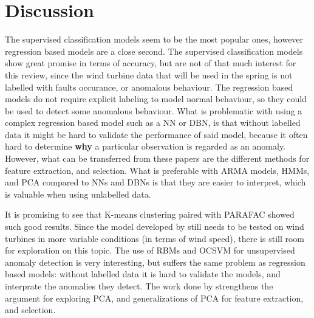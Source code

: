 \section{Discussion}
The supervised classification models seem to be the most popular ones, however regression based models are a close second. 
The supervised classification models show great promise in terms of accuracy, but are not of that much interest for this review, since the wind turbine data that will be used in the spring is not labelled with faults occurance, or anomalous behaviour. 
The regression based models do not require explicit labeling to model normal behaviour, so they could be used to detect some anomalous behaviour. 
What is problematic with using a complex regression based model such as a NN or DBN, is that without labelled data it might be hard to validate the performance of said model, because it often hard to determine \textbf{why} a particular observation is regarded as an anomaly. 
However, what can be transferred from these papers are the different methods for feature extraction, and selection. 
What is preferable with ARMA models, HMMs, and PCA compared to NNs and DBNs is that they are easier to interpret, which is valuable when using unlabelled data. \bigskip

It is promising to see that K-means clustering paired with PARAFAC showed such good results. 
Since the model developed by \textcite{fault_detect_PARAFAC_k_means} still needs to be tested on wind turbines in more variable conditions (in terms of wind speed), there is still room for exploration on this topic. 
The use of RBMs and OCSVM for unsupervised anomaly detection is very interesting, but suffers the same problem as regression based models: without labelled data it is hard to validate the models, and interprate the anomalies they detect. 
The work done by \textcite{multiway_PCA_multivar_inference_cm_wt} strengthens the argument for exploring PCA, and generalizations of PCA for feature extraction, and selection.
